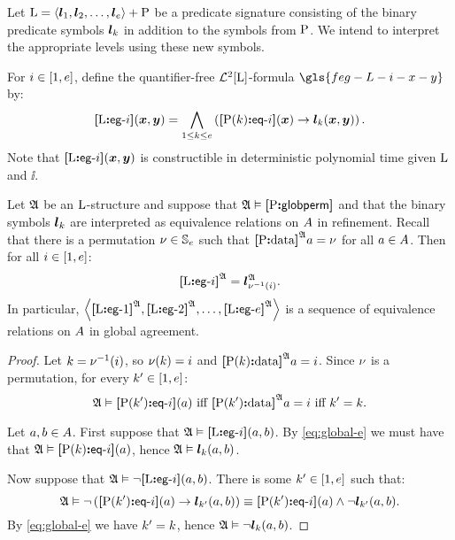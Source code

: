 Let ${\mathrm{L}} = \left\langle \bm{l}_{1}, \bm{l}_{2}, \dots, \bm{l}_{e} \right\rangle + {\mathrm{P}}$ be a predicate
signature consisting of the binary predicate symbols $\bm{l}_{k}$ in addition to
the symbols from ${\mathrm{P}}$.
We intend to interpret the appropriate levels using these new symbols.

\begin{definition}
For $i \in [1, e]$, define the quantifier-free $\mathcal{L}^{2}[{\mathrm{L}}]$-formula
$\gls{feg-L-i-x-y}$ by:
\[
  {\bm{[}{\mathrm{L}}\mathord{\bm{:}}\mathsf{eg}{\hbox{-}}i\bm{]}}(\bm{x},\bm{y}) = \bigwedge_{1 \leq k \leq e}
  \left({\bm{[}{\mathrm{P}}(k)\mathord{\bm{:}}\mathsf{eq}{\hbox{-}}i\bm{]}}(\bm{x}) \rightarrow \bm{l}_{k}(\bm{x}, \bm{y})\right).
\]
Note that ${\bm{[}{\mathrm{L}}\mathord{\bm{:}}\mathsf{eg}{\hbox{-}}i\bm{]}}(\bm{x},\bm{y})$ is constructible in deterministic polynomial
time given ${\mathrm{L}}$ and $\ii$.
\end{definition}
\begin{remark}\label{rem:global-e-m}
Let $\mathfrak{A}$ be an ${\mathrm{L}}$-structure and suppose that 
$\mathfrak{A} \vDash {\bm{[}{\mathrm{P}}\mathord{\bm{:}}\mathsf{globperm}\bm{]}}$
and that the binary symbols $\bm{l}_{k}$ are interpreted as equivalence relations
on $A$ in refinement.
Recall that there is a permutation $\nu \in \mathbb{S}_{e}$ such that
${\bm{[}{\mathrm{P}}\mathord{\bm{:}}\mathrm{data}\bm{]}}^{\mathfrak{A}}a =\nu$ for all $a \in A$.
Then for all $i \in [1, e]$:
\[
  {\bm{[}{\mathrm{L}}\mathord{\bm{:}}\mathsf{eg}{\hbox{-}}i\bm{]}}^{\mathfrak{A}} = \bm{l}_{\nu^{-1}(i)}^{\mathfrak{A}}.
\]
In particular,
$\left\langle {\bm{[}{\mathrm{L}}\mathord{\bm{:}}\mathsf{eg}{\hbox{-}}1\bm{]}}^{\mathfrak{A}}, {\bm{[}{\mathrm{L}}\mathord{\bm{:}}\mathsf{eg}{\hbox{-}}2\bm{]}}^{\mathfrak{A}}, \dots, {\bm{[}{\mathrm{L}}\mathord{\bm{:}}\mathsf{eg}{\hbox{-}}e\bm{]}}^{\mathfrak{A}} \right\rangle$ is
a sequence of equivalence relations on $A$ in global agreement.
\end{remark}
\begin{proof}
Let $k = \nu^{-1}(i)$, so $\nu(k) = i$ and
${\bm{[}{\mathrm{P}}(k)\mathord{\bm{:}}\mathrm{data}\bm{]}}^{\mathfrak{A}}a = i$.
Since $\nu$ is a permutation, for every ${k'} \in [1, e]$:
\begin{equation}\label{eq:global-e}
\mifff{ 
  \StrA \vDash \feqA{\PS(\kkp)}\ii(\ea)}{
  \data{\PSp\kkp}\StrA\ea = \ii}{
  \kkp = \kk}.
\end{equation}

Let $a, b \in A$.
First suppose that $\mathfrak{A} \vDash {\bm{[}{\mathrm{L}}\mathord{\bm{:}}\mathsf{eg}{\hbox{-}}i\bm{]}}(a,b)$.
By \cref{eq:global-e} we must have that ${\mathfrak{A} \vDash
{\bm{[}{\mathrm{P}}(k)\mathord{\bm{:}}\mathsf{eq}{\hbox{-}}i\bm{]}}(a)}$, hence $\mathfrak{A} \vDash \bm{l}_{k}(a,b)$.

Now suppose that $\mathfrak{A} \vDash \lnot{\bm{[}{\mathrm{L}}\mathord{\bm{:}}\mathsf{eg}{\hbox{-}}i\bm{]}}(a,b)$. There is some
${k'} \in [1, e]$ such that:
\[
  \mathfrak{A} \vDash \lnot\left({\bm{[}{\mathrm{P}}({k'})\mathord{\bm{:}}\mathsf{eq}{\hbox{-}}i\bm{]}}(a) \rightarrow
  \bm{l}_{{k'}}(a,b)\right) \equiv {\bm{[}{\mathrm{P}}({k'})\mathord{\bm{:}}\mathsf{eq}{\hbox{-}}i\bm{]}}(a) \land
  \lnot\bm{l}_{{k'}}(a,b).
\]
By \cref{eq:global-e} we have ${k'} = k$, hence
$\mathfrak{A} \vDash \lnot\bm{l}_{k}(a,b)$.
\end{proof}

